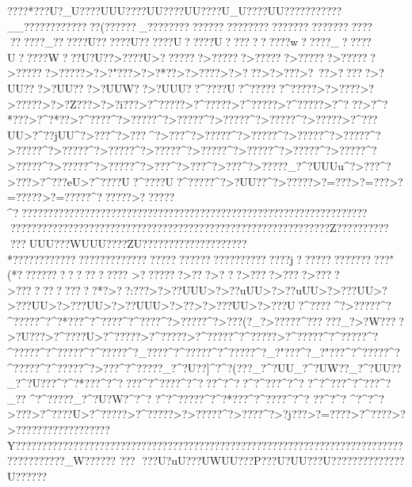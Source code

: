 {{{{{{{{{{{{{{{{{{{{{{{{{{{{{{{{{{{{{{{{{{{{{{{{{{{{{{{{{{{{{{{{{{{{{{{{{{{{{{{{{{{{{{{{{{{{{{{{{{{{{{{{{{{{{{{{{{{{{{{{{{{{{{{{{{{{{{{{{{{{{{{{{{{{{{{{{{{{{{{{{{{{{{{{{{{{{{{{{{{{{{{{{{{{{{{{{{{{{{{{{{{{{{{{{{{{{{{{{{{{{{{{{{{{{{{{{{{{{{{{{{{{{{{{{{{{{{{{{{{{{{{{{{{{{{{{{{{{{{{{{{{{{{{{{{{{{{{{{{{{{{{{{{{{{{{{{{{{{{{{{{{{{{{{{{{{{{{{{{{{{{{{{{{{{{{{{{{{{{{{{{{{{{{{{{{{{{{{{{{{{{{{{{{{{{{{{{{{{{{{{{{{{{{{{{{{{{{{{{{{{{{{{{{{{{{{{{{{{{{{{{{{{{{{{{{{{{{{{{{{{{{{{{{{{{{{{{{{{{{{{{{{{{{{{{{{{{{{{{{{{{{{{{{{{{{{{{{{{{{{{{{{{{{{{{{{{{{{{{{{{{{{{{{{{{{{{{{{{{{{{{{{{{{{{{{{{{{{{{{{{{{{{{{{{{{{{{{{{{{{{{{{{{{{{{{{{{{{{{{{{{{{{{{{{{{{{{{{{{{{{{????*  ???U?_U????UUU????UU????UU????U_U????UU???????????__??????????????(??????_??????????????????????????????????????????????_??????U??????U??????U?????U??????????w?????_?????U?????W???U?U??>????U>???????>??????>??????>??????>??????>??????>?????>?>?"???>?>? *??>?>? ???>?>? ??>?>?  ??>?~?   ?>??  ???>?UU???>?UU???>?UUW??>?UUU??^????U?^??????^?????>?>???? >?>?????>?>?Z???>?>?i???>?^?????>?^?????>?^?????>?^?????>?^? ??>?^?*???>?^? *??>?^? ???^?>?????^?>?????^?>?????^?>?????^?>?????>?^???UU>?^??jUU^?>???  ^?>??? ^?>???^?>?????^?>?????^?>?????^?>?????^?>?????^?>?????^?>?????^?>?????^?>?????^?>?????^?>?????^?>?????^?>?????^?>?????^?>?????^?>???  ^?>???  ^?>???  ^?>?????_?^?UUUu^?>???^?>???  >?^???eU>?^????U?^????U?^?????^?>?UU??^?>?????>?=???>?=???>?=?????>?=?????^??????>??????^???????????????????????? ????????????????????????????????????????????????????????????????????????????????????????????????????????Z??????????
 ???UUU???WUUU????ZU????????????????????*??????????????????????????????????????????????????j????????????????"(*???? ?????    ??   ??????
>???????>?   ??>?   ??>?  ???>?  ???>?  ???>?  ????   ???  ????  *?>??:???>?>??UUU>?>??uUU>?>??uUU>?>???UU>?>???UU>?>???UU>?>??UUU>?>??   >?>???UU>?>???}U?^????^?>?????^?^?????^?^?*???^?^? ???^?^? ???^?>?????^?>???(?_?>?????^??????_?>?W????>?U???>?^????U>?^?????>?^?????>?^?????^?^?????>?^?????^?^?????^?^?????^?^?????^?^?????^?_? ???^?^?????^?^?????^?_?"???^?_?"???^?^?????^?^?????^?^?????^?>???  ^?^?????_?^?U??]^?^?(???_?^?UU}}_?^?UW??_?^?UU??_?^?U???^?^?*???^?^????^?^? ???^?^? ??^?^?  ?^?^?  ??^?^?  
?^?^?  ??^?^?  ??^?_?  ?
^?^?????_?^?U?W?^?^?   ?^?^?????^?^?*???^?^? ???^?^? 
??^?^?   
^?^?    ^?>???>?^????U>?^?????>?^?????>?>?????^?>????^?>?j???>?=????>?^? ???>?>??????????????????Y?????????????????????????????????????????????????????????????????????????????????????_W??????
???
  ???U?uU???UWUU??  ?P???U?UU???U??????????????U??????
}}}}}}}}}}}}}}}}}}}}}}}}}}}}}}}}}}}}}}}}}}}}}}}}}}}}}}}}}}}}}}}}}}}}}}}}}}}}}}}}}}}}}}}}}}}}}}}}}}}}}}}}}}}}}}}}}}}}}}}}}}}}}}}}}}}}}}}}}}}}}}}}}}}}}}}}}}}}}}}}}}}}}}}}}}}}}}}}}}}}}}}}}}}}}}}}}}}}}}}}}}}}}}}}}}}}}}}}}}}}}}}}}}}}}}}}}}}}}}}}}}}}}}}}}}}}}}}}}}}}}}}}}}}}}}}}}}}}}}}}}}}}}}}}}}}}}}}}}}}}}}}}}}}}}}}}}}}}}}}}}}}}}}}}}}}}}}}}}}}}}}}}}}}}}}}}}}}}}}}}}}}}}}}}}}}}}}}}}}}}}}}}}}}}}}}}}}}}}}}}}}}}}}}}}}}}}}}}}}}}}}}}}}}}}}}}}}}}}}}}}}}}}}}}}}}}}}}}}}}}}}}}}}}}}}}}}}}}}}}}}}}}}}}}}}}}}}}}}}}}}}}}}}}}}}}}}}}}}}}}}}}}}}}}}}}}}}}}}}}}}}}}}}}}}}}}}}}}}}}}}}}}}}}}}}}}}}}}}}}}}}}}}}}}}}}}}}}}}}}}}}}}}}}}}}}}}}}}}}}}}}}}}}}}}}}}}}}}}}}
